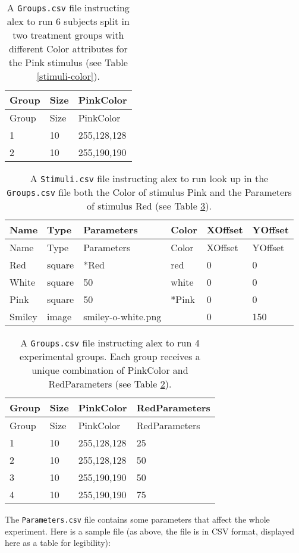 \documentclass[11pt,]{article}
\begin{document}
\begin{longtable}[c]{@{}lll@{}}
\caption{A \texttt{Groups.csv} file instructing alex to run 6 subjects
split in two treatment groups with different Color attributes for the
Pink stimulus (see Table \ref{stimuli-color}).
\label{subjects-color}}\tabularnewline
\toprule
Group & Size & PinkColor\tabularnewline
\midrule
\endfirsthead
\toprule
Group & Size & PinkColor\tabularnewline
\midrule
\endhead
1 & 10 & 255,128,128\tabularnewline
2 & 10 & 255,190,190\tabularnewline
\bottomrule
\end{longtable}

\begin{longtable}[c]{@{}llllll@{}}
\caption{A \texttt{Stimuli.csv} file instructing alex to run look up in
the \texttt{Groups.csv} file both the Color of stimulus Pink and the
Parameters of stimulus Red (see Table \ref{subjects-color-parameters}).
\label{stimuli-color-parameters}}\tabularnewline
\toprule
Name & Type & Parameters & Color & XOffset & YOffset\tabularnewline
\midrule
\endfirsthead
\toprule
Name & Type & Parameters & Color & XOffset & YOffset\tabularnewline
\midrule
\endhead
Red & square & *Red & red & 0 & 0\tabularnewline
White & square & 50 & white & 0 & 0\tabularnewline
Pink & square & 50 & *Pink & 0 & 0\tabularnewline
Smiley & image & smiley-o-white.png & & 0 & 150\tabularnewline
\bottomrule
\end{longtable}

\begin{longtable}[c]{@{}llll@{}}
\caption{A \texttt{Groups.csv} file instructing alex to run 4
experimental groups. Each group receives a unique combination of
PinkColor and RedParameters (see Table \ref{stimuli-color-parameters}).
\label{subjects-color-parameters}}\tabularnewline
\toprule
Group & Size & PinkColor & RedParameters\tabularnewline
\midrule
\endfirsthead
\toprule
Group & Size & PinkColor & RedParameters\tabularnewline
\midrule
\endhead
1 & 10 & 255,128,128 & 25\tabularnewline
2 & 10 & 255,128,128 & 50\tabularnewline
3 & 10 & 255,190,190 & 50\tabularnewline
4 & 10 & 255,190,190 & 75\tabularnewline
\bottomrule
\end{longtable}


The \texttt{Parameters.csv} file contains some parameters that affect
the whole experiment. Here is a sample file (as above, the file is in
CSV format, displayed here as a table for legibility):
\end{document}
